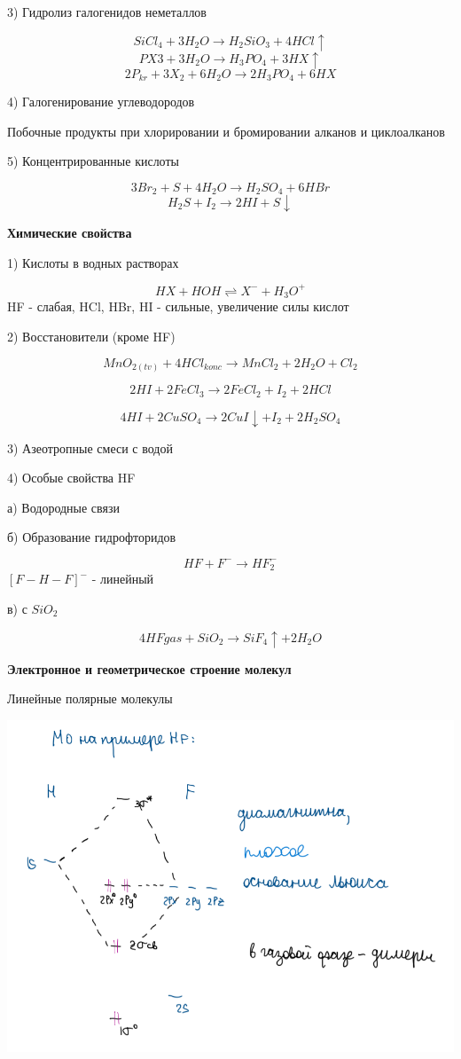 \documentclass[14pt,a4paper]{scrartcl}
\begin{document}
3) Гидролиз галогенидов неметаллов

$$SiCl_4 + 3H_2O \rightarrow H_2SiO_3 + 4HCl \uparrow$$
$$PX3 + 3H_2O  \rightarrow H_3PO_4 + 3HX\uparrow$$
$$2P_{kr} + 3X_2 + 6H_2O \rightarrow 2H_3PO_4 + 6HX$$

4) Галогенирование углеводородов

Побочные продукты при хлорировании и бромировании алканов и циклоалканов

5) Концентрированные кислоты

$$3Br_2 + S + 4H_2O \rightarrow H_2SO_4 + 6HBr$$
$$H_2S + I_2 \rightarrow 2HI + S\downarrow$$

\textbf{Химические свойства}

1) Кислоты в водных растворах

$$HX + HOH \rightleftharpoons X^- + H_3O^+$$
HF - слабая, HCl, HBr, HI - сильные, увеличение силы кислот

2) Восстановители (кроме HF)

$$MnO_{2(tv)} + 4HCl_{konc} \rightarrow MnCl_2 + 2H_2O + Cl_2$$

$$2HI + 2FeCl_3 \rightarrow 2FeCl_2 + I_2 + 2HCl$$

$$4HI + 2CuSO_4 \rightarrow2CuI\downarrow + I_2 + 2H_2SO_4$$

3) Азеотропные смеси с водой
 
4) Особые свойства HF

а) Водородные  связи

б) Образование гидрофторидов

$$HF + F^- \rightarrow HF_2^-$$
$[F-H-F]^-$ - линейный

в) с $SiO_2$

$$4HF{gas} + SiO_2 \rightarrow SiF_4\uparrow + 2H_2O$$

\textbf{Электронное и геометрическое строение молекул}

Линейные полярные молекулы

\includegraphics{4v1.png}
\end{document}
